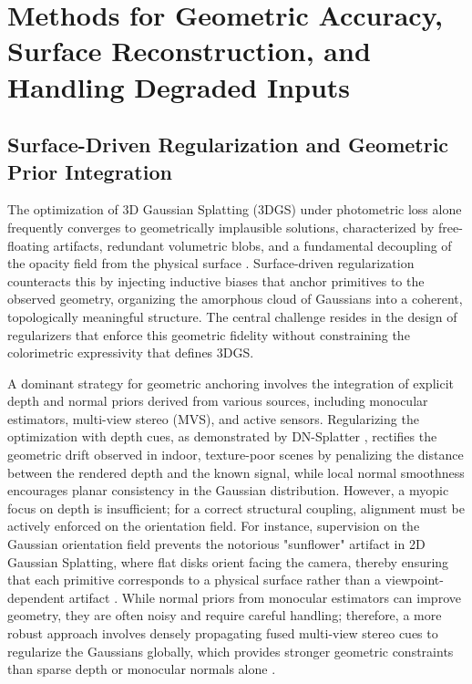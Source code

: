 \documentclass[11pt,a4paper]{article}
\begin{document}
\section{Methods for Geometric Accuracy, Surface Reconstruction, and Handling Degraded Inputs}



\subsection{Surface-Driven Regularization and Geometric Prior Integration}


The optimization of 3D Gaussian Splatting (3DGS) under photometric loss alone frequently converges to geometrically implausible solutions, characterized by free-floating artifacts, redundant volumetric blobs, and a fundamental decoupling of the opacity field from the physical surface \cite{arxiv:2308.04079v1}. Surface-driven regularization counteracts this by injecting inductive biases that anchor primitives to the observed geometry, organizing the amorphous cloud of Gaussians into a coherent, topologically meaningful structure. The central challenge resides in the design of regularizers that enforce this geometric fidelity without constraining the colorimetric expressivity that defines 3DGS.

A dominant strategy for geometric anchoring involves the integration of explicit depth and normal priors derived from various sources, including monocular estimators, multi-view stereo (MVS), and active sensors. Regularizing the optimization with depth cues, as demonstrated by DN-Splatter \cite{arxiv:2403.17822v1}, rectifies the geometric drift observed in indoor, texture-poor scenes by penalizing the distance between the rendered depth and the known signal, while local normal smoothness encourages planar consistency in the Gaussian distribution. However, a myopic focus on depth is insufficient; for a correct structural coupling, alignment must be actively enforced on the orientation field. For instance, supervision on the Gaussian orientation field prevents the notorious "sunflower" artifact in 2D Gaussian Splatting, where flat disks orient facing the camera, thereby ensuring that each primitive corresponds to a physical surface rather than a viewpoint-dependent artifact \cite{arxiv:2403.17888v1}. While normal priors from monocular estimators can improve geometry, they are often noisy and require careful handling; therefore, a more robust approach involves densely propagating fused multi-view stereo cues to regularize the Gaussians globally, which provides stronger geometric constraints than sparse depth or monocular normals alone \cite{arxiv:2401.03890v2}.
\end{document}

